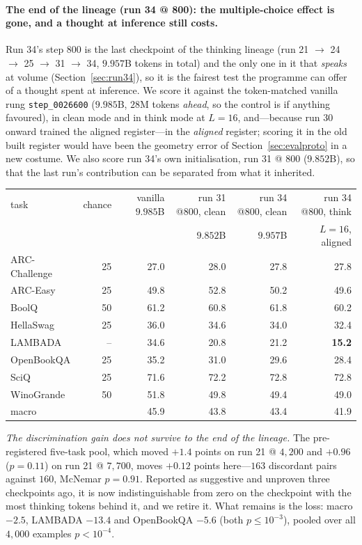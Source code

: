 \documentclass{article} %
\begin{document}
\paragraph{The end of the lineage (run 34 @ 800): the multiple-choice effect is gone, and a thought at inference still costs.} Run 34's step $800$ is the last checkpoint of the thinking lineage (run 21 $\to$ 24 $\to$ 25 $\to$ 31 $\to$ 34, $9.957$B tokens in total) and the only one in it that \emph{speaks} at volume (Section~\ref{sec:run34}), so it is the fairest test the programme can offer of a thought spent at inference. We score it against the token-matched vanilla rung \texttt{step\_0026600} ($9.985$B, $28$M tokens \emph{ahead}, so the control is if anything favoured), in clean mode and in think mode at $L{=}16$, and---because run 30 onward trained the aligned register---in the \emph{aligned} register; scoring it in the old built register would have been the geometry error of Section~\ref{sec:evalproto} in a new costume. We also score run 34's own initialisation, run 31 @ $800$ ($9.852$B), so that the last run's contribution can be separated from what it inherited.
\begin{center}\small
\begin{tabular}{lrrrrr}
\toprule
task & chance & vanilla $9.985$B & run 31 @800, clean & run 34 @800, clean & run 34 @800, think \\
 & & & $9.852$B & $9.957$B & $L{=}16$, aligned \\
\midrule
ARC-Challenge & 25 & 27.0 & 28.0 & 27.8 & 27.8 \\
ARC-Easy      & 25 & 49.8 & 52.8 & 50.2 & 49.6 \\
BoolQ         & 50 & 61.2 & 60.8 & 61.8 & 60.2 \\
HellaSwag     & 25 & 36.0 & 34.6 & 34.0 & 32.4 \\
LAMBADA       & -- & 34.6 & 20.8 & 21.2 & \textbf{15.2} \\
OpenBookQA    & 25 & 35.2 & 31.0 & 29.6 & 28.4 \\
SciQ          & 25 & 71.6 & 72.2 & 72.8 & 72.8 \\
WinoGrande    & 50 & 51.8 & 49.8 & 49.4 & 49.0 \\
\midrule
macro         &    & 45.9 & 43.8 & 43.4 & 41.9 \\
\bottomrule
\end{tabular}
\end{center}

\emph{The discrimination gain does not survive to the end of the lineage.} The pre-registered five-task pool, which moved $+1.4$ points on run 21 @ $4{,}200$ and $+0.96$ ($p = 0.11$) on run 21 @ $7{,}700$, moves $+0.12$ points here---$163$ discordant pairs against $160$, McNemar $p = 0.91$. Reported as suggestive and unproven three checkpoints ago, it is now indistinguishable from zero on the checkpoint with the most thinking tokens behind it, and we retire it. What remains is the loss: macro $-2.5$, LAMBADA $-13.4$ and OpenBookQA $-5.6$ (both $p \le 10^{-3}$), pooled over all $4{,}000$ examples $p < 10^{-4}$.
\end{document}
